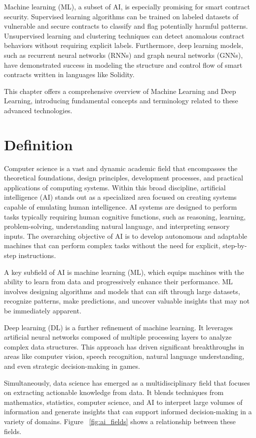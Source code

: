 Machine learning (ML), a subset of AI, is especially promising for smart contract security. Supervised learning algorithms can be trained on labeled datasets of vulnerable and secure contracts to classify and flag potentially harmful patterns. Unsupervised learning and clustering techniques can detect anomalous contract behaviors without requiring explicit labels. Furthermore, deep learning models, such as recurrent neural networks (RNNs) and graph neural networks (GNNs), have demonstrated success in modeling the structure and control flow of smart contracts written in languages like Solidity.

This chapter offers a comprehensive overview of Machine Learning and Deep Learning, introducing fundamental concepts and terminology related to these advanced technologies.

\section{Definition}
Computer science is a vast and dynamic academic field that encompasses the theoretical foundations, design principles, development processes, and practical applications of computing systems. Within this broad discipline, artificial intelligence (AI) stands out as a specialized area focused on creating systems capable of emulating human intelligence. AI systems are designed to perform tasks typically requiring human cognitive functions, such as reasoning, learning, problem-solving, understanding natural language, and interpreting sensory inputs. The overarching objective of AI is to develop autonomous and adaptable machines that can perform complex tasks without the need for explicit, step-by-step instructions.

A key subfield of AI is machine learning (ML), which equips machines with the ability to learn from data and progressively enhance their performance. ML involves designing algorithms and models that can sift through large datasets, recognize patterns, make predictions, and uncover valuable insights that may not be immediately apparent.

Deep learning (DL) is a further refinement of machine learning. It leverages artificial neural networks composed of multiple processing layers to analyze complex data structures. This approach has driven significant breakthroughs in areas like computer vision, speech recognition, natural language understanding, and even strategic decision-making in games.

Simultaneously, data science has emerged as a multidisciplinary field that focuses on extracting actionable knowledge from data. It blends techniques from mathematics, statistics, computer science, and AI to interpret large volumes of information and generate insights that can support informed decision-making in a variety of domains. Figure ~\ref{fig:ai_fields} shows a relationship between these fields. 


